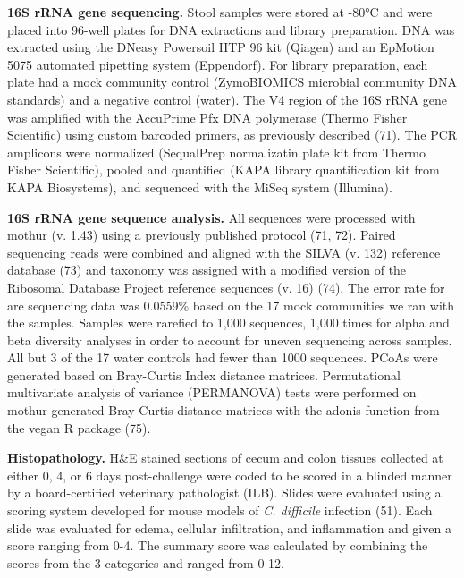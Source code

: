\documentclass[
  11pt,
]{article}
\begin{document}
\textbf{16S rRNA gene sequencing.} Stool samples were stored at -80°C
and were placed into 96-well plates for DNA extractions and library
preparation. DNA was extracted using the DNeasy Powersoil HTP 96 kit
(Qiagen) and an EpMotion 5075 automated pipetting system (Eppendorf).
For library preparation, each plate had a mock community control
(ZymoBIOMICS microbial community DNA standards) and a negative control
(water). The V4 region of the 16S rRNA gene was amplified with the
AccuPrime Pfx DNA polymerase (Thermo Fisher Scientific) using custom
barcoded primers, as previously described (71). The PCR amplicons were
normalized (SequalPrep normalizatin plate kit from Thermo Fisher
Scientific), pooled and quantified (KAPA library quantification kit from
KAPA Biosystems), and sequenced with the MiSeq system (Illumina).

\textbf{16S rRNA gene sequence analysis.} All sequences were processed
with mothur (v. 1.43) using a previously published protocol (71, 72).
Paired sequencing reads were combined and aligned with the SILVA (v.
132) reference database (73) and taxonomy was assigned with a modified
version of the Ribosomal Database Project reference sequences (v. 16)
(74). The error rate for are sequencing data was 0.0559\% based on the
17 mock communities we ran with the samples. Samples were rarefied to
1,000 sequences, 1,000 times for alpha and beta diversity analyses in
order to account for uneven sequencing across samples. All but 3 of the
17 water controls had fewer than 1000 sequences. PCoAs were generated
based on Bray-Curtis Index distance matrices. Permutational multivariate
analysis of variance (PERMANOVA) tests were performed on
mothur-generated Bray-Curtis distance matrices with the adonis function
from the vegan R package (75).

\textbf{Histopathology.} H\&E stained sections of cecum and colon
tissues collected at either 0, 4, or 6 days post-challenge were coded to
be scored in a blinded manner by a board-certified veterinary
pathologist (ILB). Slides were evaluated using a scoring system
developed for mouse models of \emph{C. difficile} infection (51). Each
slide was evaluated for edema, cellular infiltration, and inflammation
and given a score ranging from 0-4. The summary score was calculated by
combining the scores from the 3 categories and ranged from 0-12.
\end{document}
